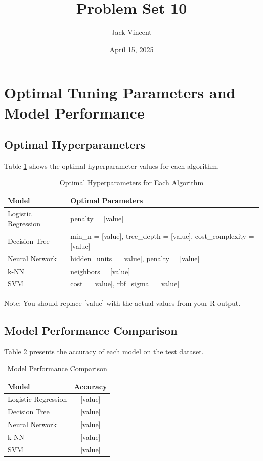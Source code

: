 \documentclass{article}
\title{Problem Set 10}
\author{Jack Vincent}
\date{April 15, 2025}
\begin{document}
\maketitle

\section{Optimal Tuning Parameters and Model Performance}


\subsection{Optimal Hyperparameters}

Table \ref{tab:parameters} shows the optimal hyperparameter values for each algorithm.

\begin{table}[H]
\centering
\caption{Optimal Hyperparameters for Each Algorithm}
\label{tab:parameters}
\begin{tabular}{ll}
\toprule
Model & Optimal Parameters \\
\midrule
Logistic Regression & penalty = [value] \\
Decision Tree & min\_n = [value], tree\_depth = [value], cost\_complexity = [value] \\
Neural Network & hidden\_units = [value], penalty = [value] \\
k-NN & neighbors = [value] \\
SVM & cost = [value], rbf\_sigma = [value] \\
\bottomrule
\end{tabular}
\end{table}

Note: You should replace [value] with the actual values from your R output.

\subsection{Model Performance Comparison}

Table \ref{tab:accuracy} presents the accuracy of each model on the test dataset.

\begin{table}[H]
\centering
\caption{Model Performance Comparison}
\label{tab:accuracy}
\begin{tabular}{lc}
\toprule
Model & Accuracy \\
\midrule
Logistic Regression & [value] \\
Decision Tree & [value] \\
Neural Network & [value] \\
k-NN & [value] \\
SVM & [value] \\
\bottomrule
\end{tabular}
\end{table}
\end{document}
